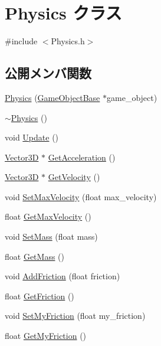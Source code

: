\hypertarget{class_physics}{}\section{Physics クラス}
\label{class_physics}


{\ttfamily \#include $<$Physics.\+h$>$}

\subsection*{公開メンバ関数}
\begin{DoxyCompactItemize}
\item 
\mbox{\hyperlink{class_physics_a2e4cab77c53c0acf5273bd4986f8423d}{Physics}} (\mbox{\hyperlink{class_game_object_base}{Game\+Object\+Base}} $\ast$game\+\_\+object)
\item 
\mbox{\hyperlink{class_physics_a045c3788e28059d3920136499942490f}{$\sim$\+Physics}} ()
\item 
void \mbox{\hyperlink{class_physics_a13bf3e9de07a12afc3c0a4012e00d0a1}{Update}} ()
\item 
\mbox{\hyperlink{class_vector3_d}{Vector3D}} $\ast$ \mbox{\hyperlink{class_physics_aee9ce4604f63dbdcab07ded4d0174989}{Get\+Acceleration}} ()
\item 
\mbox{\hyperlink{class_vector3_d}{Vector3D}} $\ast$ \mbox{\hyperlink{class_physics_a8e33f600575e7ee5ad348d695a9eb45e}{Get\+Velocity}} ()
\item 
void \mbox{\hyperlink{class_physics_afd9e36bb94e921a41818f261df4205d0}{Set\+Max\+Velocity}} (float max\+\_\+velocity)
\item 
float \mbox{\hyperlink{class_physics_a0ee3b82e3e1588fee1727e582c824467}{Get\+Max\+Velocity}} ()
\item 
void \mbox{\hyperlink{class_physics_a7a6eac8c5f6d7db0baef290710825085}{Set\+Mass}} (float mass)
\item 
float \mbox{\hyperlink{class_physics_a80a377efcd573cff3484d91c9f5512e4}{Get\+Mass}} ()
\item 
void \mbox{\hyperlink{class_physics_a77e9a04f034ccad4fec996832fb7ce63}{Add\+Friction}} (float friction)
\item 
float \mbox{\hyperlink{class_physics_aee1fe26db953d0712b2a26ce9d1db0d9}{Get\+Friction}} ()
\item 
void \mbox{\hyperlink{class_physics_a0e3c9825aa4129a2212c1c61d0cd6ecb}{Set\+My\+Friction}} (float my\+\_\+friction)
\item 
float \mbox{\hyperlink{class_physics_a50ad9d79f3b42a209a05f57557f294f0}{Get\+My\+Friction}} ()

\end{DoxyCompactItemize}
